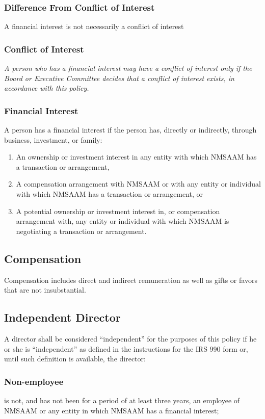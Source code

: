 \documentclass[letterpaper,12pt]{article}
\begin{document}
\subsubsection{Difference From Conflict of Interest}
\label{sec:org4a76241}
A financial interest is not necessarily a conflict of interest
\subsubsection{Conflict of Interest}
\label{sec:org581d694}
\emph{A person who has a financial interest may have a conflict of
interest only if the Board or Executive Committee decides that a
conflict of interest exists, in accordance with this policy.}
\subsubsection{Financial Interest}
\label{sec:orgaf3be8e}
A person has a financial interest if the person has, directly or
indirectly, through business, investment, or family:
\begin{enumerate}[{2.2.3}.a]
\item An ownership or investment interest in any entity with which
NMSAAM has a transaction or arrangement,
\item A compensation arrangement with NMSAAM or with any entity or
individual with which NMSAAM has a transaction or arrangement,
or
\item A potential ownership or investment interest in, or
compensation arrangement with, any entity or individual with
which NMSAAM is negotiating a transaction or arrangement.
\end{enumerate}
\subsection{Compensation}
\label{sec:orge033cec}
Compensation includes direct and indirect remuneration as well as gifts or
favors that are not insubstantial.
\subsection{Independent Director}
\label{sec:org47488ec}
A director shall be considered “independent” for the purposes of
this policy if he or she is “independent” as defined in the
instructions for the IRS 990 form or, until such definition is
available, the director:
\subsubsection{Non-employee}
\label{sec:orgcec241f}
is not, and has not been for a period of at least three years, an
employee of NMSAAM or any entity in which NMSAAM has a financial
interest;
\end{document}
